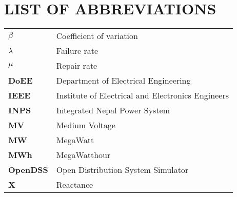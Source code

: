 

\chapter*{LIST OF ABBREVIATIONS}
{}

\begin{table}[H]
\begin{tabular}{ll}
\textbf{$\beta$}   & Coefficient of variation                          \\
\textbf{$\lambda$} & Failure rate                                      \\
\textbf{$\mu$}     & Repair rate                                       \\
\textbf{DoEE}      & Department of Electrical Engineering              \\
\textbf{IEEE}      & Institute of Electrical and Electronics Engineers \\
\textbf{INPS}      & Integrated Nepal Power System                     \\
\textbf{MV}        & Medium Voltage                                    \\
\textbf{MW}        & MegaWatt                                         \\
\textbf{MWh}       & MegaWatthour                                     \\
\textbf{OpenDSS}   & Open Distribution System Simulator                \\
\textbf{X}         & Reactance                                        
\end{tabular}
\end{table}

